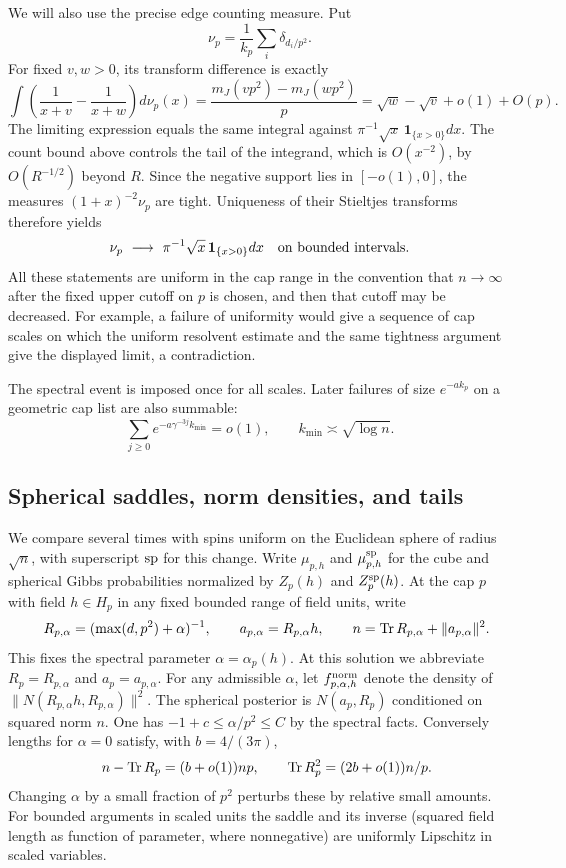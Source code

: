 We will also use the precise edge counting measure. Put
\[
 \nu_p=\frac1{k_p}\sum_i\delta_{d_i/p^2}.
\]
For fixed $v,w>0$, its transform difference is exactly
\[
 \int\left(\frac1{x+v}-\frac1{x+w}\right)d\nu_p(x)
 =\frac{m_J(vp^2)-m_J(wp^2)}p
 =\sqrt w-\sqrt v+o(1)+O(p).
\]
The limiting expression equals the same integral against
$\pi^{-1}\sqrt x\,\mathbf1_{\{x>0\}}dx$. The count bound above controls
the tail of the integrand, which is $O(x^{-2})$, by $O(R^{-1/2})$ beyond
$R$. Since the negative support lies in $[-o(1),0]$, the measures
$(1+x)^{-2}\nu_p$ are tight. Uniqueness of their Stieltjes transforms
therefore yields
\[
 \nu_p\ \longrightarrow\ \pi^{-1}\sqrt x\,
                    \mathbf1_{\{x>0\}}dx
 \quad\hbox{on bounded intervals}.
\]
All these statements are uniform in the cap range in the convention
that $n\to\infty$ after the fixed upper cutoff on $p$ is chosen, and
then that cutoff may be decreased. For example, a failure of uniformity
would give a sequence of cap scales on which the uniform resolvent
estimate and the same tightness argument give the displayed limit,
a contradiction.

The spectral event is imposed once for all scales. Later failures of
size $e^{-a k_p}$ on a geometric cap list are also summable:
\[
 \sum_{j\ge0}e^{-a\gamma^{-3j}k_{\min}}=o(1),
 \qquad k_{\min}\asymp\sqrt{\log n}.
\]

\subsection{Spherical saddles, norm densities, and tails}
We compare several times with spins uniform on the Euclidean sphere of radius
\(\sqrt n\), with superscript \({\rm sp}\) for this change. Write
\(\mu_{p,h}\) and \(\mu_{p,h}^{\rm sp}\) for the cube and spherical Gibbs
probabilities normalized by \(Z_p(h)\) and \(Z_p^{\rm sp}(h)\).
At the cap \(p\) with field \(h\in H_p\) in any fixed bounded range of field
units, write
\begin{equation}
\label{cap:saddle}\quad R_{p,\alpha}=(\max(d,p^2)+\alpha)^{-1},\qquad
 a_{p,\alpha}=R_{p,\alpha}h,\qquad
 n={\rm Tr}\,R_{p,\alpha}+\|a_{p,\alpha}\|^2 .
\end{equation}
This fixes the spectral parameter \(\alpha=\alpha_p(h)\). At this solution
we abbreviate \(R_p=R_{p,\alpha}\) and \(a_p=a_{p,\alpha}\). For any admissible
\(\alpha\), let \(f_{p,\alpha,h}^{\rm norm}\) denote the density of
\(\|N(R_{p,\alpha}h,R_{p,\alpha})\|^2\). The spherical posterior is
\(N(a_p,R_p)\) conditioned on squared norm \(n\). One has
\(-1+c\le\alpha/p^2\le C\) by the spectral facts. Conversely lengths for
\(\alpha=0\) satisfy, with \(b=4/(3\pi)\),
\begin{equation}
\label{cap:trace-constants}\quad n-{\rm Tr}\,R_p=(b+o(1))np,\qquad {\rm Tr}\,R_p^2=(2b+o(1))n/p .
\end{equation}
Changing \(\alpha\) by a small fraction of \(p^2\) perturbs these by relative
small amounts. For bounded arguments in scaled units the saddle and its
inverse (squared field length as function of parameter, where nonnegative) are
uniformly Lipschitz in scaled variables.

